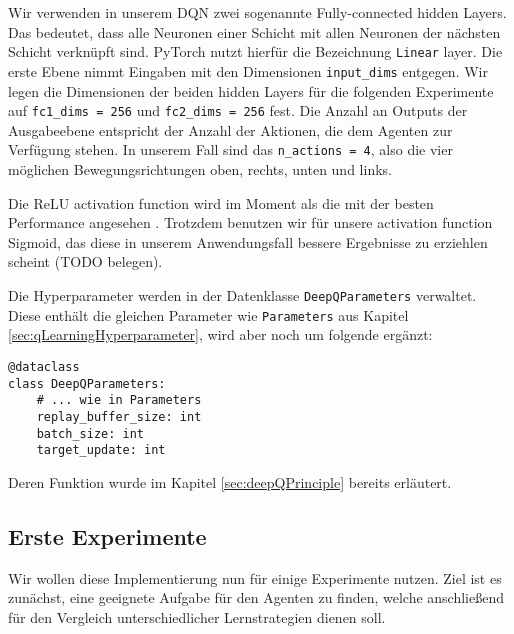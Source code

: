 Wir verwenden in unserem DQN zwei sogenannte Fully-connected hidden Layers. Das bedeutet, dass alle Neuronen einer Schicht mit allen Neuronen der nächsten Schicht verknüpft sind. PyTorch nutzt hierfür die Bezeichnung \texttt{Linear} layer. Die erste Ebene nimmt Eingaben mit den Dimensionen \texttt{input_dims} entgegen. Wir legen die Dimensionen der beiden hidden Layers für die folgenden Experimente auf \texttt{fc1_dims = 256} und \texttt{fc2_dims = 256} fest. Die Anzahl an Outputs der Ausgabeebene entspricht der Anzahl der Aktionen, die dem Agenten zur Verfügung stehen. In unserem Fall sind das \texttt{n_actions = 4}, also die vier möglichen Bewegungsrichtungen oben, rechts, unten und links.

Die ReLU activation function wird im Moment als die mit der besten Performance angesehen \cite{10_stevens2020deep}. Trotzdem benutzen wir für unsere activation function Sigmoid, das diese in unserem Anwendungsfall bessere Ergebnisse zu erziehlen scheint (TODO belegen). 

Die Hyperparameter werden in der Datenklasse \texttt{DeepQParameters} verwaltet. Diese enthält die gleichen Parameter wie \texttt{Parameters} aus Kapitel \ref{sec:qLearningHyperparameter}, wird aber noch um folgende ergänzt:
\begin{verbatim}
@dataclass
class DeepQParameters:
    # ... wie in Parameters
    replay_buffer_size: int
    batch_size: int
    target_update: int
\end{verbatim}
Deren Funktion wurde im Kapitel \ref{sec:deepQPrinciple} bereits erläutert.

\subsection{Erste Experimente} \label{sec:deepQFirstExperiments}
Wir wollen diese Implementierung nun für einige Experimente nutzen. Ziel ist es zunächst, eine geeignete Aufgabe für den Agenten zu finden, welche anschließend für den Vergleich unterschiedlicher Lernstrategien dienen soll.

